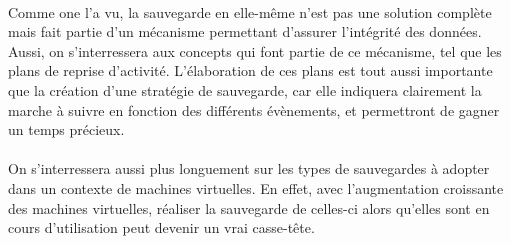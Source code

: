\documentclass[a4paper,11pt]{report}
\begin{document}
\paragraph{}
Comme one l'a vu, la sauvegarde en elle-même n'est pas une solution complète mais fait partie d'un mécanisme permettant d'assurer l'intégrité des données.
Aussi, on s'interressera aux concepts qui font partie de ce mécanisme, tel que les plans de reprise d'activité.
L'élaboration de ces plans est tout aussi importante que la création d'une stratégie de sauvegarde, car elle indiquera clairement la marche à suivre en fonction des différents évènements, et permettront de gagner un temps précieux.

\paragraph{}
On s'interressera aussi plus longuement sur les types de sauvegardes à adopter dans un contexte de machines virtuelles.
En effet, avec l'augmentation croissante des machines virtuelles, réaliser la sauvegarde de celles-ci alors qu'elles sont en cours d'utilisation peut devenir un vrai casse-tête.



\end{document}
